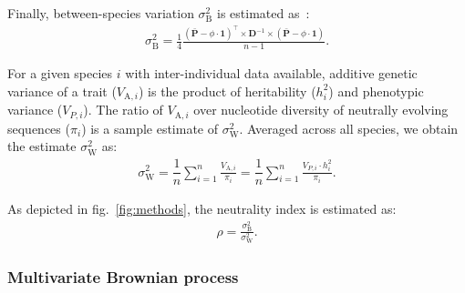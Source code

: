 \documentclass{article}
\newcommand{\Multiply}{\cdot}
\newcommand{\MultiplyMatrix}{\times}
\newcommand{\UniDimArray}[1]{\bm{#1}}
\newcommand{\BiDimArray}[1]{\bm{#1}}
\newcommand{\tr}{^{\intercal}}
\newcommand{\inv}{^{-1}}
\newcommand{\Spi}{i}
\newcommand{\NbrTaxa}{n}
\newcommand{\Trait}{P}
\newcommand{\Heritability}{h^2}
\newcommand{\VecTrait}{\UniDimArray{\bar{\Trait}}}
\newcommand{\RootTrait}{\phi}
\newcommand{\VecOne}{\UniDimArray{1}}
\newcommand{\Distance}{\BiDimArray{D}}
\newcommand{\DistanceMatrix}{\BiDimArray{\Distance}}
\newcommand{\VarGeneticSpi}{V_{\mathrm{A}, \Spi}}
\newcommand{\RateBetween}{\sigma^2_{\mathrm{B}}}
\newcommand{\RateWhithin}{\sigma^2_{\mathrm{W}}}
\newcommand{\NI}{\rho}
\begin{document}
Finally, between-species variation $\RateBetween$ is estimated as~\citep{omeara_testing_2006}:
\begin{gather}
    \RateBetween = \frac{1}{4}\frac{\left( \VecTrait -  \RootTrait \Multiply \VecOne \right)\tr \MultiplyMatrix \DistanceMatrix\inv \MultiplyMatrix \left( \VecTrait -  \RootTrait \Multiply \VecOne  \right)}{\NbrTaxa - 1}. \label{eq:estimated-rate-phy}
\end{gather}

For a given species $\Spi$ with inter-individual data available, additive genetic variance of a trait ($\VarGeneticSpi$) is the product of heritability ($\Heritability_{i}$) and phenotypic variance ($V_{\Trait, i}$).
The ratio of $\VarGeneticSpi$ over nucleotide diversity of neutrally evolving sequences ($\pi_{\Spi}$) is a sample estimate of $\RateWhithin$.
Averaged across all species, we obtain the estimate $\RateWhithin$ as:
\begin{gather}
    \RateWhithin = \dfrac{1}{\NbrTaxa}\sum_{i=1}^{\NbrTaxa}\frac{  \VarGeneticSpi}{ \pi_{i}} = \dfrac{1}{\NbrTaxa}\sum_{i=1}^{\NbrTaxa} \frac{  V_{\Trait, i} \Multiply \Heritability_{i}}{ \pi_{i}}. \label{eq:estimated-rate-pop}
\end{gather}

As depicted in fig.~\ref{fig:methods}, the neutrality index is estimated as:
\begin{gather}
    \NI = \frac{\RateBetween}{\RateWhithin}. \label{eq:estimated-NI}
\end{gather}

\subsubsection*{Multivariate Brownian process}
\end{document}
